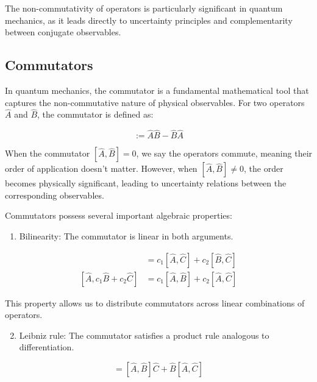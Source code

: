 The non-commutativity of operators is particularly significant in quantum mechanics, as it leads directly to uncertainty principles and complementarity between conjugate observables.


\subsection{Commutators}

In quantum mechanics, the commutator is a fundamental mathematical tool that captures the non-commutative nature of physical observables. For two operators $\hat{A}$ and $\hat{B}$, the commutator is defined as:

\begin{equation}
[\hat{A}, \hat{B}] := \hat{A}\hat{B} - \hat{B}\hat{A}
\end{equation}

When the commutator $[\hat{A}, \hat{B}] = 0$, we say the operators commute, meaning their order of application doesn't matter. However, when $[\hat{A}, \hat{B}] \neq 0$, the order becomes physically significant, leading to uncertainty relations between the corresponding observables.

Commutators possess several important algebraic properties:

\begin{enumerate}
  \item Bilinearity: The commutator is linear in both arguments.
\end{enumerate}

\begin{align}
[c_{1}\hat{A} + c_{2}\hat{B}, \hat{C}] &= c_{1}[\hat{A}, \hat{C}] + c_{2}[\hat{B}, \hat{C}] \\
[\hat{A}, c_{1}\hat{B} + c_{2}\hat{C}] &= c_{1}[\hat{A}, \hat{B}] + c_{2}[\hat{A}, \hat{C}]
\end{align}

This property allows us to distribute commutators across linear combinations of operators.

\begin{enumerate}
  \setcounter{enumi}{1}
  \item Leibniz rule: The commutator satisfies a product rule analogous to differentiation.
\end{enumerate}

\begin{equation}
[\hat{A}, \hat{B}\hat{C}] = [\hat{A}, \hat{B}]\hat{C} + \hat{B}[\hat{A}, \hat{C}]
\end{equation}

